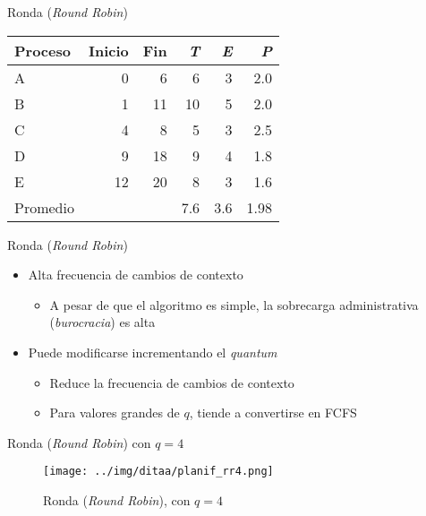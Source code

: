 \documentclass[presentation]{beamer}
\begin{document}
\begin{frame}[label={sec:orgfb5a51e}]{Ronda (\emph{Round Robin})}
\begin{center}
\begin{tabular}{lrrrrr}
Proceso & Inicio & Fin & \emph{T} & \emph{E} & \emph{P}\\
\hline
A & 0 & 6 & 6 & 3 & 2.0\\
B & 1 & 11 & 10 & 5 & 2.0\\
C & 4 & 8 & 5 & 3 & 2.5\\
D & 9 & 18 & 9 & 4 & 1.8\\
E & 12 & 20 & 8 & 3 & 1.6\\
\hline
Promedio &  &  & 7.6 & 3.6 & 1.98\\
\end{tabular}
\end{center}
\end{frame}

\begin{frame}[label={sec:orgda4d406}]{Ronda (\emph{Round Robin})}
\begin{itemize}
\item Alta frecuencia de cambios de contexto
\begin{itemize}
\item A pesar de que el algoritmo es simple, la sobrecarga
administrativa (\emph{burocracia}) es alta
\end{itemize}
\item Puede modificarse incrementando el \emph{quantum}
\begin{itemize}
\item Reduce la frecuencia de cambios de contexto
\item Para valores grandes de \(q\), tiende a convertirse en FCFS
\end{itemize}
\end{itemize}
\end{frame}

\begin{frame}[label={sec:org6ea2859}]{Ronda (\emph{Round Robin}) con \(q = 4\)}
\begin{figure}[htbp]
\centering
\texttt{[image: ../img/ditaa/planif\_rr4.png]}
\caption{Ronda (\emph{Round Robin}), con \(q=4\)}
\end{figure}
\end{frame}
\end{document}
